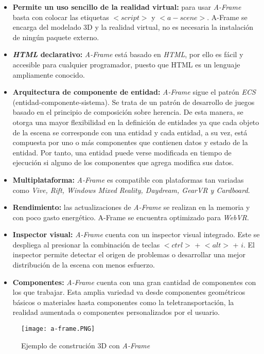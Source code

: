 \begin{itemize}
    \item \textbf{Permite un uso sencillo de la realidad virtual:} para usar \textit{A-Frame} basta con colocar las etiquetas $<script>$ y $<a-scene>$. A-Frame se encarga del modelado 3D y la realidad virtual, no es necesaria la instalación de ningún paquete externo.
    \item \textbf{\textit{HTML} declarativo:} \textit{A-Frame} está basado en \textit{HTML}, por ello es fácil y accesible para cualquier programador, puesto que HTML es un lenguaje ampliamente conocido.
    \item \textbf{Arquitectura de componente de entidad:} \textit{A-Frame} sigue el patrón \textit{ECS} (entidad-componente-sistema). Se trata de un patrón de desarrollo de juegos basado en el principio de composición sobre herencia. De esta manera, se otorga una mayor flexibilidad en la definición de entidades ya que cada objeto de la escena se corresponde con una entidad y cada entidad, a su vez, está compuesta por uno o más componentes que contienen datos y estado de la entidad. Por tanto, una entidad puede verse modificada en tiempo de ejecución si alguno de los componentes que agrega modifica sus datos.
    \item \textbf{Multiplataforma: } \textit{A-Frame} es compatible con plataformas tan variadas como \textit{Vive, Rift, Windows Mixed Reality, Daydream, GearVR y Cardboard}.
    \item \textbf{Rendimiento:} las actualizaciones de \textit{A-Frame} se realizan en la memoria y con poco gasto energético. A-Frame se encuentra optimizado para \textit{WebVR}.
    \item  \textbf{Inspector visual:} \textit{A-Frame} cuenta con un inspector visual integrado. Este se despliega al presionar la combinación de teclas $<ctrl>$ + $<alt>$ + $i$. El inspector permite detectar el origen de problemas o desarrollar una mejor distribución de la escena con menos esfuerzo.
    \item \textbf{Componentes:} \textit{A-Frame} cuenta con una gran cantidad de componentes con los que trabajar. Esta amplia variedad va desde componentes geométricos básicos o materiales hasta componentes como la teletransportación, la realidad aumentada o componentes personalizados por el usuario.
\end{itemize}

\begin{figure}[h!]
    \centering
    \texttt{[image: a-frame.PNG]} 
    \caption[Ejemplo de construción 3D con \textit{A-Frame}]{Ejemplo de construción 3D con \textit{A-Frame} \footnotemark}
    \label{fig:a-frame}
\end{figure}

